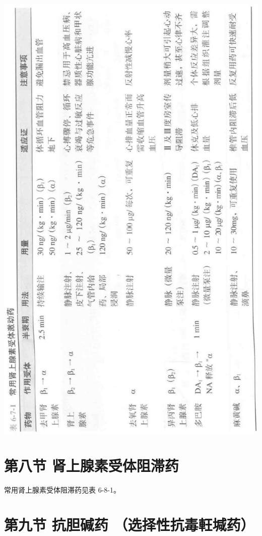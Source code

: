 \documentclass[10pt]{article}
\begin{document}
\begin{center}
\includegraphics[max width=\textwidth]{2024_07_05_645bb794a4d4f32ee0c8g-342}
\end{center}

\section*{第八节 肾上腺素受体阻滞药}
常用肾上腺素受体阻滞药见表 6-8-1。

\section*{第九节 抗胆碱药 （选择性抗毒軖堿药）}
\end{document}
